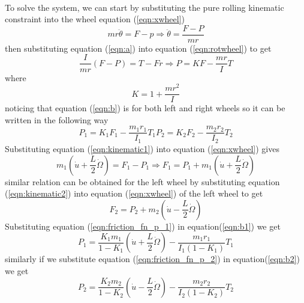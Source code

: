 \documentclass{article}
\begin{document}
	\paragraph{}To solve the system, we can start by substituting the pure rolling kinematic constraint into the wheel equation (\ref{eqn:xwheel})
	\begin{equation}
	mr\ddot{\theta}  = F - p \Rightarrow \ddot{\theta} = \frac{F-P}{mr}
	\label{eqn:a}
	\end{equation}
	then substituting equation (\ref{eqn:a}) into equation (\ref{eqn:rotwheel}) to get
	\begin{equation}
	\frac{I}{mr}\left(F-P\right) = T - Fr \Rightarrow P = KF - \frac{mr}{I}T
	\label{eqn:b}
	\end{equation}
	where 
	\[K = 1 + \frac{mr^2}{I}
	\]
	noticing that equation (\ref{eqn:b}) is for both left and right wheels so it can be written in the following way
	\begin{subequations}
		\begin{equation}
		P_1 = K_1F_1 - \frac{m_1r_1}{I_1}T_1
		\label{eqn:b1}
		\end{equation} 
		\begin{equation}
	     P_2 = K_2F_2 - \frac{m_2r_2}{I_2}T_2
		\label{eqn:b2}
		\end{equation}
	\end{subequations}
	Substituting equation (\ref{eqn:kinematic1}) into equation (\ref{eqn:xwheel}) gives
	\begin{equation}
	m_1\left(\dot{u}+\frac{L}{2}\dot{\Omega}\right) = F_1 - P_1\Rightarrow F_1 = P_1 + m_1\left(\dot{u}+\frac{L}{2}\dot{\Omega}\right)
	\label{eqn:friction_fn_p_1}
	\end{equation}
	similar relation can be obtained for the left wheel by substituting equation (\ref{eqn:kinematic2}) into equation (\ref{eqn:xwheel}) of the left wheel to get
	\begin{equation}
	 F_2 = P_2 +m_2\left(\dot{u}-\frac{L}{2}\dot{\Omega}\right) 
	 \label{eqn:friction_fn_p_2}
	\end{equation}
	Substituting equation (\ref{eqn:friction_fn_p_1})  in equation(\ref{eqn:b1}) we get
	\begin{equation}
	P_1 = \frac{K_1m_1}{1-K_1}\left(\dot{u}+ \frac{L}{2}\dot{\Omega}\right)-\frac{m_1r_1}{I_1(1-K_1)}T_1
	\label{eqn:p1}
	\end{equation}
	similarly if we substitute equation (\ref{eqn:friction_fn_p_2}) in equation(\ref{eqn:b2}) we get
	\begin{equation}
	P_2 = \frac{K_2m_2}{1-K_2}\left(\dot{u}- \frac{L}{2}\dot{\Omega}\right)-\frac{m_2r_2}{I_2(1-K_2)}T_2
	\label{eqn:p2}
	\end{equation}
\end{document}
